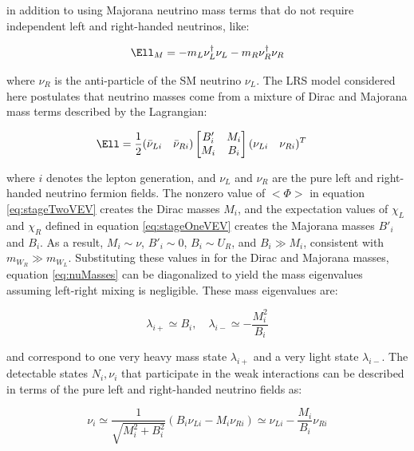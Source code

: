in addition to using Majorana neutrino mass terms that do not require independent left and right-handed 
neutrinos, like:

\begin{equation}
	\Ell_{M} = -m_{L}\nu^{\dagger}_{L}\nu_{L} - m_{R}\nu^{\dagger}_{R}\nu_{R}
\end{equation}

where $\nu_{R}$ is the anti-particle of the SM neutrino $\nu_{L}$.  The LRS model considered here postulates 
that neutrino masses come from a mixture of Dirac and Majorana mass terms \cite{seeSawAndParityViolation,seeSawAndGUTs} described by the Lagrangian:

\begin{align}
	\Ell &= \frac{1}{2}(\bar{\nu}_{Li} \quad \bar{\nu}_{Ri})\begin{bmatrix}
	B'_{i} & M_{i} \\
	M_{i} & B_{i}
\end{bmatrix}(\nu_{Li} \quad \nu_{Ri})^{T}
\label{eq:nuMasses}
\end{align}

where $i$ denotes the lepton generation, and $\nu_{L}$ and $\nu_{R}$ are the pure left and right-handed 
neutrino fermion fields.  The nonzero value of $<\Phi>$ in equation \ref{eq:stageTwoVEV} creates the 
Dirac masses $M_{i}$, and the expectation values of $\chi_{L}$ and $\chi_{R}$ defined in equation \ref{eq:stageOneVEV} 
creates the Majorana masses $B'_{i}$ and $B_{i}$.  As a result, $M_{i} \sim \nu$, $B'_{i} \sim 0$, 
$B_{i} \sim U_{R}$, and $B_{i} \gg M_{i}$, consistent with $m_{W_{R}} \gg m_{W_{L}}$.  Substituting 
these values in for the Dirac and Majorana masses, equation \ref{eq:nuMasses} can be diagonalized to 
yield the mass eigenvalues assuming left-right mixing is negligible.  These mass eigenvalues are:

\begin{equation}
	\lambda_{i+} \simeq B_{i},  \quad \lambda_{i-} \simeq -\frac{M^{2}_{i}}{B_{i}}
\end{equation}

and correspond to one very heavy mass state $\lambda_{i+}$ and a very light state $\lambda_{i-}$.  The 
detectable states $N_{i}, \nu_{i}$ that participate in the weak interactions can be described in terms of 
the pure left and right-handed neutrino fields as:

\begin{equation}
	\nu_{i} \simeq \frac{1}{\sqrt{M^{2}_{i} + B^{2}_{i}}}(B_{i}\nu_{Li} - M_{i}\nu_{Ri}) \simeq \nu_{Li} - \frac{M_{i}}{B_{i}}\nu_{Ri}
\end{equation}

